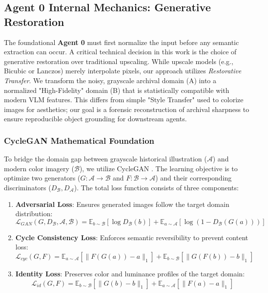 \documentclass[12pt,onecolumn,a4paper]{IEEEtran}
\begin{document}
\subsection{Agent 0 Internal Mechanics: Generative Restoration}
The foundational \textbf{Agent 0} must first normalize the input before any semantic extraction can occur. A critical technical decision in this work is the choice of generative restoration over traditional upscaling. While upscale models (e.g., Bicubic or Lanczos) merely interpolate pixels, our approach utilizes \textit{Restorative Transfer}. We transform the noisy, grayscale archival domain (A) into a normalized "High-Fidelity" domain (B) that is statistically compatible with modern VLM features. This differs from simple "Style Transfer" used to colorize images for aesthetics; our goal is a forensic reconstruction of archival sharpness to ensure reproducible object grounding for downstream agents.

\subsubsection{CycleGAN Mathematical Foundation}
To bridge the domain gap between grayscale historical illustration ($\mathcal{A}$) and modern color imagery ($\mathcal{B}$), we utilize CycleGAN \cite{cyclegan2017}. 
The learning objective is to optimize two generators ($G: \mathcal{A} \rightarrow \mathcal{B}$ and $F: \mathcal{B} \rightarrow \mathcal{A}$) and their corresponding discriminators ($D_\mathcal{B}, D_\mathcal{A}$). The total loss function consists of three components:

\begin{enumerate}
    \item \textbf{Adversarial Loss}: Ensures generated images follow the target domain distribution:
    \begin{equation}
        \mathcal{L}_{GAN}(G, D_\mathcal{B}, \mathcal{A}, \mathcal{B}) = \mathbb{E}_{b \sim \mathcal{B}}[\log D_\mathcal{B}(b)] + \mathbb{E}_{a \sim \mathcal{A}}[\log(1 - D_\mathcal{B}(G(a)))]
    \end{equation}
    
    \item \textbf{Cycle Consistency Loss}: Enforces semantic reversibility to prevent content loss:
    \begin{equation}
        \mathcal{L}_{cyc}(G, F) = \mathbb{E}_{a \sim \mathcal{A}}[\|F(G(a)) - a\|_1] + \mathbb{E}_{b \sim \mathcal{B}}[\|G(F(b)) - b\|_1]
    \end{equation}
    
    \item \textbf{Identity Loss}: Preserves color and luminance profiles of the target domain:
    \begin{equation}
        \mathcal{L}_{id}(G, F) = \mathbb{E}_{b \sim \mathcal{B}}[\|G(b) - b\|_1] + \mathbb{E}_{a \sim \mathcal{A}}[\|F(a) - a\|_1]
    \end{equation}
\end{enumerate}
\end{document}
